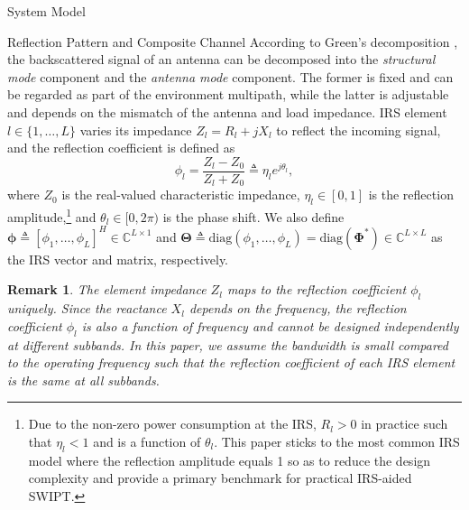 \documentclass[journal]{IEEEtran}
\newtheorem{remark}{Remark}
\begin{document}
\begin{section}{System Model}
		\begin{subsection}{Reflection Pattern and Composite Channel}
			According to Green's decomposition \cite{Hansen1989}, the backscattered signal of an antenna can be decomposed into the \emph{structural mode} component and the \emph{antenna mode} component. The former is fixed and can be regarded as part of the environment multipath, while the latter is adjustable and depends on the mismatch of the antenna and load impedance. IRS element $l \in \{1, \dots, L\}$ varies its impedance $Z_l = R_l + j X_l$ to reflect the incoming signal, and the reflection coefficient is defined as
			\begin{equation}
				\phi_l = \frac{Z_l - Z_0}{Z_l + Z_0} \triangleq \eta_l e^{j\theta_l},
			\end{equation}
			where $Z_0$ is the real-valued characteristic impedance, $\eta_l \in [0, 1]$ is the reflection amplitude,\footnote{Due to the non-zero power consumption at the IRS, $R_l > 0$ in practice such that $\eta_l < 1$ and is a function of $\theta_l$. This paper sticks to the most common IRS model where the reflection amplitude equals \num{1} so as to reduce the design complexity and provide a primary benchmark for practical IRS-aided SWIPT.} and $\theta_l \in [0,2\pi)$ is the phase shift. We also define $\boldsymbol{\phi} \triangleq [\phi_1, \dots, \phi_L]^H \in \mathbb{C}^{L \times 1}$ and $\boldsymbol{\Theta} \triangleq \mathrm{diag}(\phi_1, \dots, \phi_L)=\mathrm{diag}(\boldsymbol{\Phi}^*) \in \mathbb{C}^{L \times L}$ as the IRS vector and matrix, respectively.

			\begin{remark}\label{re:reflection_coefficient}
				The element impedance $Z_l$ maps to the reflection coefficient $\phi_l$ uniquely. Since the reactance $X_l$ depends on the frequency, the reflection coefficient $\phi_l$ is also a function of frequency and cannot be designed independently at different subbands. In this paper, we assume the bandwidth is small compared to the operating frequency such that the reflection coefficient of each IRS element is the same at all subbands.
			\end{remark}


\end{subsection}
\end{section}
\end{document}
